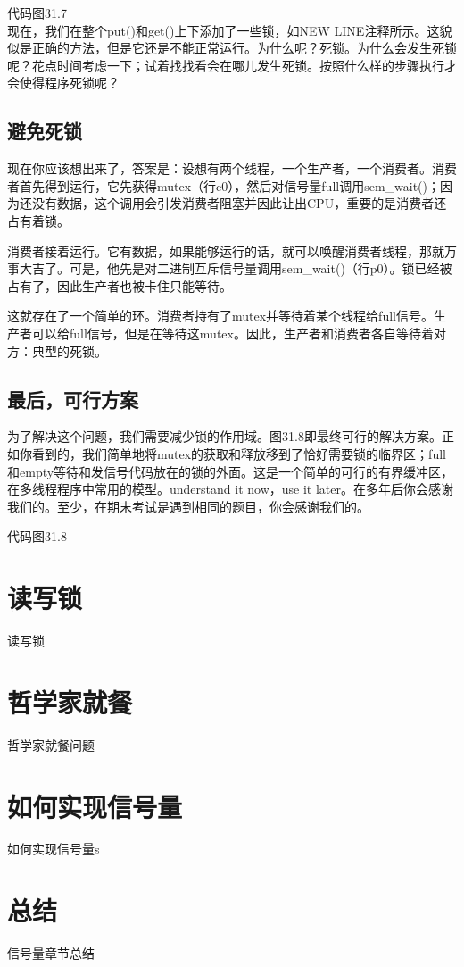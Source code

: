 代码图31.7\\

现在，我们在整个put()和get()上下添加了一些锁，如NEW LINE注释所示。这貌似是正确的方法，但是它还是不能正常运行。为什么呢？死锁。为什么会发生死锁呢？花点时间考虑一下；试着找找看会在哪儿发生死锁。按照什么样的步骤执行才会使得程序死锁呢？


\subsection*{避免死锁}
现在你应该想出来了，答案是：设想有两个线程，一个生产者，一个消费者。消费者首先得到运行，它先获得mutex（行c0），然后对信号量full调用sem\_wait()；因为还没有数据，这个调用会引发消费者阻塞并因此让出CPU，重要的是消费者还占有着锁。

消费者接着运行。它有数据，如果能够运行的话，就可以唤醒消费者线程，那就万事大吉了。可是，他先是对二进制互斥信号量调用sem\_wait()（行p0）。锁已经被占有了，因此生产者也被卡住只能等待。

这就存在了一个简单的环。消费者持有了mutex并等待着某个线程给full信号。生产者可以给full信号，但是在等待这mutex。因此，生产者和消费者各自等待着对方：典型的死锁。

\subsection*{最后，可行方案}
为了解决这个问题，我们需要减少锁的作用域。图31.8即最终可行的解决方案。正如你看到的，我们简单地将mutex的获取和释放移到了恰好需要锁的临界区；full和empty等待和发信号代码放在的锁的外面。这是一个简单的可行的有界缓冲区，在多线程程序中常用的模型。understand it now，use it later。在多年后你会感谢我们的。至少，在期末考试是遇到相同的题目，你会感谢我们的。

代码图31.8\\

\section{读写锁}
读写锁

\section{哲学家就餐}

哲学家就餐问题

\section{如何实现信号量}

如何实现信号量s

\section{总结}

信号量章节总结












